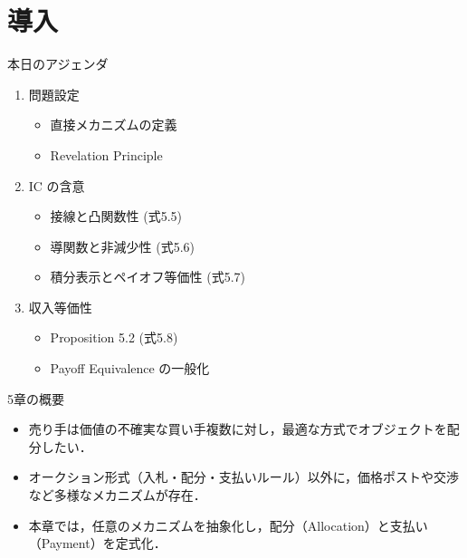 \documentclass[dvipdfmx,autodetect-engine]{beamer}
\title{\papertitle}
\author{\paperauthor}
\institute{\paperaffil}
\date{\paperdate}
\begin{document}
\begin{frame}
  \titlepage
\end{frame}

\section{導入}
\begin{frame}{本日のアジェンダ}
  \begin{enumerate}
    \item 問題設定 \hfill{\footnotesize}
      \begin{itemize}
        \item 直接メカニズムの定義 
        \item Revelation Principle
      \end{itemize}
    \item IC の含意 \hfill{\footnotesize}
      \begin{itemize}
        \item 接線と\alert{凸関数}性 (式5.5) 
        \item 導関数と\alert{非減少性} (式5.6) 
        \item 積分表示と\alert{ペイオフ等価性} (式5.7) 
      \end{itemize}
    \item 収入等価性\hfill{\footnotesize}
      \begin{itemize}
        \item Proposition 5.2 (式5.8)
        \item Payoff Equivalence の一般化
      \end{itemize}
  \end{enumerate}
\end{frame}

\begin{frame}{5章の概要}
  \begin{itemize}
    \item 売り手は価値の不確実な買い手複数に対し，最適な方式でオブジェクトを配分したい．
    \item オークション形式（入札・配分・支払いルール）以外に，価格ポストや交渉など多様なメカニズムが存在．
    \item 本章では，任意のメカニズムを抽象化し，配分（Allocation）と支払い（Payment）を定式化．
  \end{itemize}
\end{frame}
\end{document}
